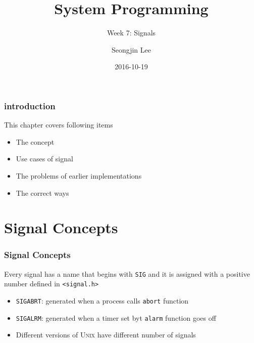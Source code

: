 \documentclass[newPxFont,sthlmFooter,nooffset]{beamer}
\title{System Programming}
\subtitle{Week 7: Signals}
\author[SJL]{Seongjin Lee}
\institute{\href{mailto:insight@hanyang.ac.kr}{insight@hanyang.ac.kr}\\\url{http://esos.hanyang.ac.kr}\\Esos Lab. Hanyang University}
\date{2016-10-19}
\begin{document}
\frame[plain]{\titlepage} 






\begin{frame}[t]
  \frametitle{introduction}
This chapter covers following items
  \begin{itemize}
  \item The concept
  \item Use cases of signal
  \item The problems of earlier implementations
  \item The correct ways
  \end{itemize}

\end{frame}

\section{Signal Concepts}


\begin{frame}[t]
  \frametitle{Signal Concepts}

Every signal has a name that begins with \texttt{SIG} and it is assigned with a positive number defined in \texttt{<signal.h>}
\begin{itemize}
\item \texttt{SIGABRT}: generated when a process calls \texttt{abort} function
\item \texttt{SIGALRM}: generated when a timer set byt \texttt{alarm} function goes off
\item Different versions of \textsc{Unix} have different number of signals
\end{itemize}
\end{frame}
\end{document}
